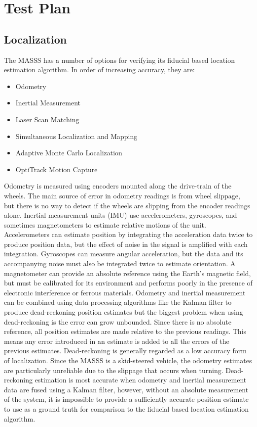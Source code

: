 \section{Test Plan}
\label{sec:scenario}
\subsection{Localization}
\label{see:loctestscenario}
The MASSS has a number of options for verifying its fiducial based location estimation algorithm. In order of increasing accuracy, they are:
\begin{itemize}
    \item Odometry
    \item Inertial Measurement
    \item Laser Scan Matching
    \item Simultaneous Localization and Mapping
    \item Adaptive Monte Carlo Localization
    \item OptiTrack Motion Capture
\end{itemize}

Odometry is measured using encoders mounted along the drive-train of the wheels. The main source of error in odometry readings is from wheel slippage, but there is no way to detect if the wheels are slipping from the encoder readings alone. Inertial measurement units (IMU) use accelerometers, gyroscopes, and sometimes magnetometers to estimate relative motions of the unit. Accelerometers can estimate position by integrating the acceleration data twice to produce position data, but the effect of noise in the signal is amplified with each integration. Gyroscopes can measure angular acceleration, but the data and its accompanying noise must also be integrated twice to estimate orientation. A magnetometer can provide an absolute reference using the Earth's magnetic field, but must be calibrated for its environment and performs poorly in the presence of electronic interference or ferrous materials. Odometry and inertial measurement can be combined using data processing algorithms like the Kalman filter to produce dead-reckoning position estimates but the biggest problem when using dead-reckoning is the error can grow unbounded. Since there is no absolute reference, all position estimates are made relative to the previous readings. This means any error introduced in an estimate is added to all the errors of the previous estimates. Dead-reckoning is generally regarded as a low accuracy form of localization. Since the MASSS is a skid-steered vehicle, the odometry estimates are particularly unreliable due to the slippage that occurs when turning. Dead-reckoning estimation is most accurate when odometry and inertial measurement data are fused using a Kalman filter, however, without an absolute measurement of the system, it is impossible to provide a sufficiently accurate position estimate to use as a ground truth for comparison to the fiducial based location estimation algorithm.\\

